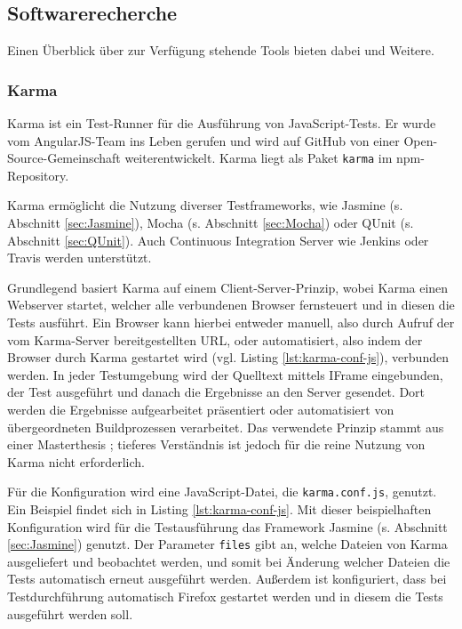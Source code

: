 \subsection{Softwarerecherche}
Einen Überblick über zur Verfügung stehende Tools bieten dabei \cite{unittest-overview} und Weitere.

\subsubsection{Karma}
\label{sec:Karma}
Karma ist ein Test-Runner für die Ausführung von JavaScript-Tests. Er wurde vom AngularJS-Team ins Leben gerufen und wird auf GitHub von einer Open-Source-Gemeinschaft weiterentwickelt.\cite{karma-index} Karma liegt als Paket \texttt{karma} im npm-Repository\cite{karma-faq}.

Karma ermöglicht die Nutzung diverser Testframeworks, wie Jasmine (s. Abschnitt \ref{sec:Jasmine}), Mocha (s. Abschnitt \ref{sec:Mocha}) oder QUnit (s. Abschnitt \ref{sec:QUnit}). Auch Continuous Integration Server wie Jenkins oder Travis werden unterstützt.\cite{karma-faq}

Grundlegend basiert Karma auf einem Client-Server-Prinzip, wobei Karma einen Webserver startet, welcher alle verbundenen Browser fernsteuert und in diesen die Tests ausführt. Ein Browser kann hierbei entweder manuell, also durch Aufruf der vom Karma-Server bereitgestellten URL, oder automatisiert, also indem der Browser durch Karma gestartet wird (vgl. Listing \ref{lst:karma-conf-js}), verbunden werden. In jeder Testumgebung wird der Quelltext mittels IFrame eingebunden, der Test ausgeführt und danach die Ergebnisse an den Server gesendet. Dort werden die Ergebnisse aufgearbeitet präsentiert oder automatisiert von übergeordneten Buildprozessen verarbeitet. Das verwendete Prinzip stammt aus einer Masterthesis \cite{karma-masterThesis}; tieferes Verständnis ist jedoch für die reine Nutzung von Karma nicht erforderlich.\cite{karma-howItWorks}

Für die Konfiguration wird eine JavaScript-Datei, die \texttt{karma.conf.js}, genutzt. Ein Beispiel findet sich in Listing \ref{lst:karma-conf-js}. Mit dieser beispielhaften Konfiguration wird für die Testausführung das Framework Jasmine (s. Abschnitt \ref{sec:Jasmine}) genutzt. Der Parameter \texttt{files} gibt an, welche Dateien von Karma ausgeliefert und beobachtet werden, und somit bei Änderung welcher Dateien die Tests automatisch erneut ausgeführt werden. Außerdem ist konfiguriert, dass bei Testdurchführung automatisch Firefox gestartet werden und in diesem die Tests ausgeführt werden soll.\cite{karma-configurationFile, karma-files}


